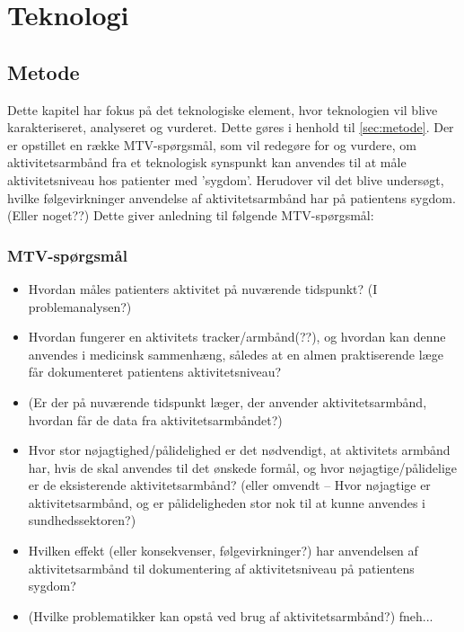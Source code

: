 \chapter{Teknologi}
\section{Metode}
Dette kapitel har fokus på det teknologiske element, hvor teknologien vil blive karakteriseret, analyseret og vurderet. Dette gøres i henhold til \autoref{sec:metode}. Der er opstillet en række MTV-spørgsmål, som vil redegøre for og vurdere, om aktivitetsarmbånd fra et teknologisk synspunkt kan anvendes til at måle aktivitetsniveau hos patienter med ’sygdom’. Herudover vil det blive undersøgt, hvilke følgevirkninger anvendelse af aktivitetsarmbånd har på patientens sygdom. (Eller noget??) Dette giver anledning til følgende MTV-spørgsmål: 
\subsection{MTV-spørgsmål}
\begin{itemize}
\item Hvordan måles patienters aktivitet på nuværende tidspunkt? (I problemanalysen?)
\item Hvordan fungerer en aktivitets tracker/armbånd(??), og hvordan kan denne anvendes i medicinsk sammenhæng, således at en almen praktiserende læge får dokumenteret patientens aktivitetsniveau?
\item (Er der på nuværende tidspunkt læger, der anvender aktivitetsarmbånd, hvordan får de data fra aktivitetsarmbåndet?)
\item Hvor stor nøjagtighed/pålidelighed er det nødvendigt, at aktivitets armbånd har, hvis de skal anvendes til det ønskede formål, og hvor nøjagtige/pålidelige er de eksisterende aktivitetsarmbånd? (eller omvendt – Hvor nøjagtige er aktivitetsarmbånd, og er pålideligheden stor nok til at kunne anvendes i sundhedssektoren?)
\item Hvilken effekt (eller konsekvenser, følgevirkninger?) har anvendelsen af aktivitetsarmbånd til dokumentering af aktivitetsniveau på patientens sygdom?
\item (Hvilke problematikker kan opstå ved brug af aktivitetsarmbånd?) fneh...

\end{itemize}








